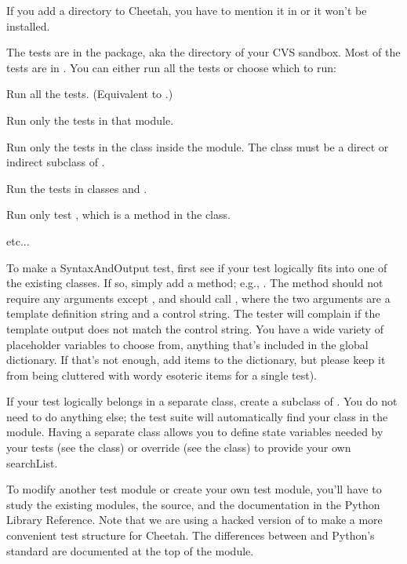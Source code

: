 If you add a directory to Cheetah, you have to mention it in  or
it won't be installed.

The tests are in the  package, aka the 
directory of your CVS sandbox.  Most of the tests are in
.  You can either run all the tests or choose which
to run:
\begin{description}
\item{}  
    Run all the tests.  (Equivalent to .)
\item{}  
    Run only the tests in that module.
\item{}  
    Run only the tests in the class  inside the module.  The class
    must be a direct or indirect subclass of
    .
\item{}  
    Run the tests in classes  and .
\item{}  
    Run only test , which is a method in the  class.
\item{etc...}
\end{description}

To make a SyntaxAndOutput test, first see if your test logically fits into one
of the existing classes.  If so, simply add a method; e.g., .
The method should not require any arguments except , and should
call , where the two arguments are
a template definition string and a control string.  The tester will complain
if the template output does not match the control string.  You have a wide
variety of placeholder variables to choose from, anything that's included in
the  global dictionary.  If that's not enough, add
items to the dictionary, but please keep it from being cluttered with wordy
esoteric items for a single test).

If your test logically belongs in a separate class, create a subclass of
.  You do not need to do anything else; the test suite will
automatically find your class in the module.  Having a separate class allows
you to define state variables needed by your tests (see the  class)
or override  (see the  class) to provide 
your own searchList.

To modify another test module or create your own test module, you'll have to
study the existing modules, the  source, and the
 documentation in the Python Library Reference.  Note that we
are using a hacked version of  to make a more convenient test
structure for Cheetah.  The differences between 
and Python's standard  are documented at the top of the module.

